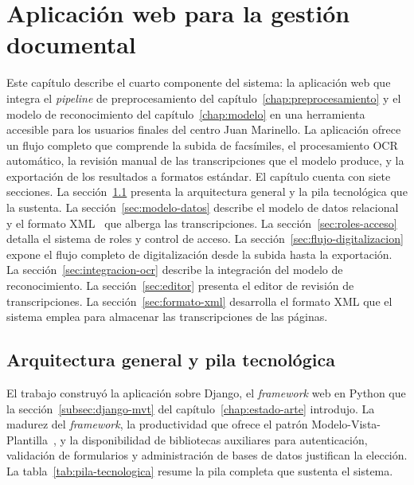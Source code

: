 \setcounter{chapter}{4}

\chapter{Aplicación web para la gestión documental}\label{chap:web}

Este capítulo describe el cuarto componente del sistema: la aplicación web que integra el \textit{pipeline} de preprocesamiento del capítulo~\ref{chap:preprocesamiento} y el modelo de reconocimiento del capítulo~\ref{chap:modelo} en una herramienta accesible para los usuarios finales del centro Juan Marinello. La aplicación ofrece un flujo completo que comprende la subida de facsímiles, el procesamiento OCR automático, la revisión manual de las transcripciones que el modelo produce, y la exportación de los resultados a formatos estándar. El capítulo cuenta con siete secciones. La sección~\ref{sec:arq-web} presenta la arquitectura general y la pila tecnológica que la sustenta. La sección~\ref{sec:modelo-datos} describe el modelo de datos relacional y el formato XML~\cite{w3c2008xml} que alberga las transcripciones. La sección~\ref{sec:roles-acceso} detalla el sistema de roles y control de acceso. La sección~\ref{sec:flujo-digitalizacion} expone el flujo completo de digitalización desde la subida hasta la exportación. La sección~\ref{sec:integracion-ocr} describe la integración del modelo de reconocimiento. La sección~\ref{sec:editor} presenta el editor de revisión de transcripciones. La sección~\ref{sec:formato-xml} desarrolla el formato XML que el sistema emplea para almacenar las transcripciones de las páginas.

\section{Arquitectura general y pila tecnológica}
\label{sec:arq-web}

El trabajo construyó la aplicación sobre Django, el \textit{framework} web en Python que la sección~\ref{subsec:django-mvt} del capítulo~\ref{chap:estado-arte} introdujo. La madurez del \textit{framework}, la productividad que ofrece el patrón Modelo-Vista-Plantilla~\cite{django2024mvt}, y la disponibilidad de bibliotecas auxiliares para autenticación, validación de formularios y administración de bases de datos justifican la elección. La tabla~\ref{tab:pila-tecnologica} resume la pila completa que sustenta el sistema.

